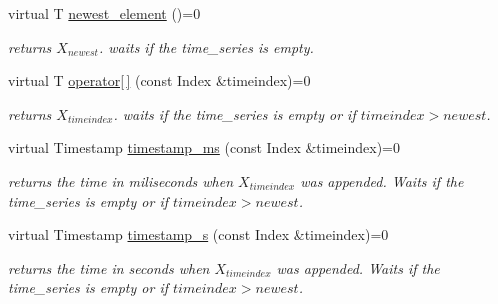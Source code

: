 \begin{DoxyCompactItemize}
virtual T \hyperlink{classtime__series_1_1TimeSeriesInterface_ad3b66b6b5f0f763d440731c50e41b4cb}{newest\+\_\+element} ()=0
\begin{DoxyCompactList}\small\item\em returns $ X_{newest} $. waits if the time\+\_\+series is empty. \end{DoxyCompactList}\item 
\mbox{\label{classtime__series_1_1TimeSeriesInterface_a3149f64961e08315eb06798d0f075333}} 
virtual T \hyperlink{classtime__series_1_1TimeSeriesInterface_a3149f64961e08315eb06798d0f075333}{operator\mbox{[}$\,$\mbox{]}} (const Index \&timeindex)=0
\begin{DoxyCompactList}\small\item\em returns $ X_{timeindex} $. waits if the time\+\_\+series is empty or if $timeindex > newest $. \end{DoxyCompactList}\item 
\mbox{\label{classtime__series_1_1TimeSeriesInterface_aaeb745c8c13170a645b25170f0b035f1}} 
virtual Timestamp \hyperlink{classtime__series_1_1TimeSeriesInterface_aaeb745c8c13170a645b25170f0b035f1}{timestamp\+\_\+ms} (const Index \&timeindex)=0
\begin{DoxyCompactList}\small\item\em returns the time in miliseconds when $ X_{timeindex} $ was appended. Waits if the time\+\_\+series is empty or if $timeindex > newest $. \end{DoxyCompactList}\item 
\mbox{\label{classtime__series_1_1TimeSeriesInterface_acfb468e6e1766fe4b566189d3b888e4d}} 
virtual Timestamp \hyperlink{classtime__series_1_1TimeSeriesInterface_acfb468e6e1766fe4b566189d3b888e4d}{timestamp\+\_\+s} (const Index \&timeindex)=0
\begin{DoxyCompactList}\small\item\em returns the time in seconds when $ X_{timeindex} $ was appended. Waits if the time\+\_\+series is empty or if $timeindex > newest $. \end{DoxyCompactList}\item 
\mbox{\label{classtime__series_1_1TimeSeriesInterface_aa09c55259a1f34491b5ecdd1505ffdbf}} 

\end{DoxyCompactItemize}

